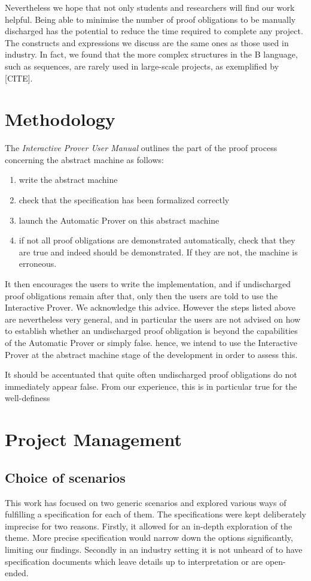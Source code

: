 \documentclass[11pt,journal]{IEEEtran}
\begin{document}
	Nevertheless we hope that not only students and researchers will find our work helpful. Being able to minimise the number of proof obligations to be manually discharged has the potential to reduce the time required to complete any project. The constructs and expressions we discuss are the same ones as those used in industry. In fact, we found that the more complex structures in the B language, such as sequences, are rarely used in large-scale projects, as exemplified by [CITE].


	\section{Methodology}
	The \emph{Interactive Prover User Manual}\cite{Prover guide} outlines the part of the proof process concerning the abstract machine as follows:
	\begin{enumerate}
		\item write the abstract machine
		\item check that the specification has been formalized correctly
		\item launch the Automatic Prover on this abstract machine
		\item if not all proof obligations are demonstrated automatically, check that they are true and indeed should be demonstrated. If they are not, the machine is erroneous.
	\end{enumerate}

	It then encourages the users to write the implementation, and if undischarged proof obligations remain after that, only then the users are told to use the Interactive Prover. We acknowledge this advice. However the steps listed above are nevertheless very general, and in particular the users are not advised on how to establish whether an undischarged proof obligation is beyond the capabilities of the Automatic Prover or simply false. hence, we intend to use the Interactive Prover at the abstract machine stage of the development in order to assess this.
	
	It should be accentuated that quite often undischarged proof obligations do not immediately appear false. From our experience, this is in particular true for the well-definess 

	\section{Project Management}
	
	\subsection{Choice of scenarios}
	This work has focused on two generic scenarios and explored various ways of fulfilling a specification for each of them. The specifications were kept deliberately imprecise for two reasons. Firstly, it allowed for an in-depth exploration of the theme. More precise specification would narrow down the options significantly, limiting our findings. Secondly in an industry setting it is not unheard of to have specification documents which leave details up to interpretation or are open-ended. 
	
\end{document}
